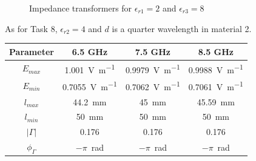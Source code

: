 \begin{figure}[htpb]
	\centering
	\caption{Impedance transformers for $\epsilon_{r1} = 2$ and $\epsilon_{r3} = 8$}
	\label{fig:Task11}
\end{figure}

As for Task 8, $\epsilon_{r2} = 4$ and $d$ is a quarter wavelength in material 2.

\begin{table}[htpb]
	\centering
	\begin{tabular}{@{}cccc@{}}
		\toprule
		Parameter & 6.5 GHz & 7.5 GHz & 8.5 GHz \\ \midrule
		$E_{max}$ & \SI{1.001}{\volt\per\meter} & \SI{0.9979}{\volt\per\meter} & \SI{0.9988}{\volt\per\meter} \\
		$E_{min}$ & \SI{0.7055}{\volt\per\meter} & \SI{0.7062}{\volt\per\meter} & \SI{0.7061}{\volt\per\meter} \\
		$l_{max}$ & \SI{44.2}{\milli\meter} & \SI{45}{\milli\meter} & \SI{45.59}{\milli\meter} \\
		$l_{min}$ & \SI{50}{\milli\meter} & \SI{50}{\milli\meter} & \SI{50}{\milli\meter} \\
		$\left|\Gamma\right|$ & 0.176 & 0.176 & 0.176 \\
		$\phi_\Gamma$ &  $-\pi$~\si{\radian} & $-\pi$~\si{\radian} & $-\pi$~\si{\radian} \\ \bottomrule
	\end{tabular}
\end{table}

